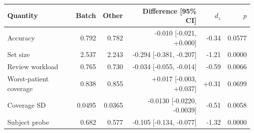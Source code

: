 \begin{tabular}{lrrrrr}
\toprule
Quantity & Batch & Other & Difference [95\% CI] & $d_z$ & $p$ \\
\midrule
Accuracy & 0.792 & 0.782 & -0.010 [-0.021, +0.000] & -0.34 & 0.0577 \\
Set size & 2.537 & 2.243 & -0.294 [-0.381, -0.207] & -1.21 & 0.0000 \\
Review workload & 0.765 & 0.730 & -0.034 [-0.055, -0.014] & -0.59 & 0.0066 \\
Worst-patient coverage & 0.838 & 0.855 & +0.017 [-0.003, +0.037] & +0.31 & 0.0699 \\
Coverage SD & 0.0495 & 0.0365 & -0.0130 [-0.0220, -0.0039] & -0.51 & 0.0058 \\
Subject probe & 0.682 & 0.577 & -0.105 [-0.134, -0.077] & -1.32 & 0.0000 \\
\bottomrule
\end{tabular}